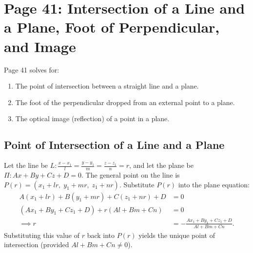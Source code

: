 \section{Page 41: Intersection of a Line and a Plane, Foot of Perpendicular, and Image}
\label{sec:page41}

\begin{conceptbox}
Page 41 solves for:
\begin{enumerate}[noitemsep]
    \item The point of intersection between a straight line and a plane.
    \item The foot of the perpendicular dropped from an external point to a plane.
    \item The optical image (reflection) of a point in a plane.
\end{enumerate}
\end{conceptbox}

\subsection{Point of Intersection of a Line and a Plane}
Let the line be $L: \frac{x - x_1}{l} = \frac{y - y_1}{m} = \frac{z - z_1}{n} = r$, and let the plane be $\Pi: Ax + By + Cz + D = 0$.
The general point on the line is $P(r) = (x_1 + lr, \; y_1 + mr, \; z_1 + nr)$.
Substitute $P(r)$ into the plane equation:
\begin{align}
    A(x_1 + lr) + B(y_1 + mr) + C(z_1 + nr) + D &= 0 \nonumber\\
    (Ax_1 + By_1 + Cz_1 + D) + r(Al + Bm + Cn) &= 0 \nonumber\\
    \implies r &= -\frac{Ax_1 + By_1 + Cz_1 + D}{Al + Bm + Cn}.
\end{align}
Substituting this value of $r$ back into $P(r)$ yields the unique point of intersection (provided $Al + Bm + Cn \neq 0$).

